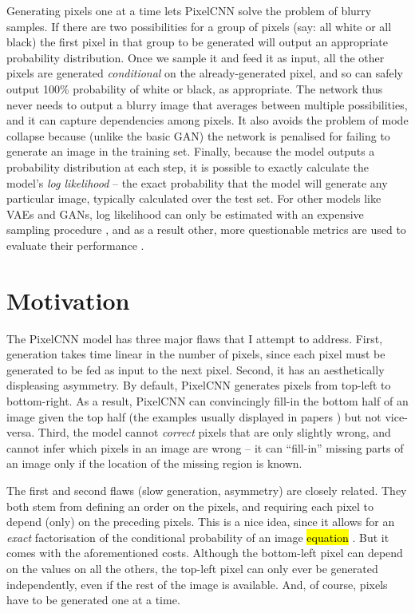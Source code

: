 \documentclass[10pt,a4paper]{article}
\newcommand{\nquote}[1]{``{#1}''}
\begin{document}
Generating pixels one at a time lets PixelCNN solve the problem of blurry samples. If there are two possibilities for a group of pixels (say: all white or all black) the first pixel in that group to be generated will output an appropriate probability distribution. Once we sample it and feed it as input, all the other pixels are generated \emph{conditional} on the already-generated pixel, and so can safely output 100\% probability of white or black, as appropriate. The network thus never needs to output a blurry image that averages between multiple possibilities, and it can capture dependencies among pixels. It also avoids the problem of mode collapse because (unlike the basic GAN) the network is penalised for failing to generate an image in the training set. Finally, because the model outputs a probability distribution at each step, it is possible to exactly calculate the model's \emph{log likelihood} \cite{??} -- the exact probability that the model will generate any particular image, typically calculated over the test set. For other models like VAEs and GANs, log likelihood can only be estimated with an expensive sampling procedure \cite{likelihoodestimation}, and as a result other, more questionable metrics are used to evaluate their performance \cite{??}.

\section{Motivation}

The PixelCNN model has three major flaws that I attempt to address. First, generation takes time linear in the number of pixels, since each pixel must be generated to be fed as input to the next pixel. Second, it has an aesthetically displeasing asymmetry. By default, PixelCNN generates pixels from top-left to bottom-right. As a result, PixelCNN can convincingly fill-in the bottom half of an image given the top half (the examples usually displayed in papers \cite{pixelcnn1,??,??}) but not vice-versa. Third, the model cannot \emph{correct} pixels that are only slightly wrong, and cannot infer which pixels in an image are wrong -- it can \nquote{fill-in} missing parts of an image only if the location of the missing region is known.

The first and second flaws (slow generation, asymmetry) are closely related. They both stem from defining an order on the pixels, and requiring each pixel to depend (only) on the preceding pixels. This is a nice idea, since it allows for an \emph{exact} factorisation of the conditional probability of an image \hl{equation} \cite{pixelcnn1}. But it comes with the aforementioned costs. Although the bottom-left pixel can depend on the values on all the others, the top-left pixel can only ever be generated independently, even if the rest of the image is available. And, of course, pixels have to be generated one at a time.
\end{document}

